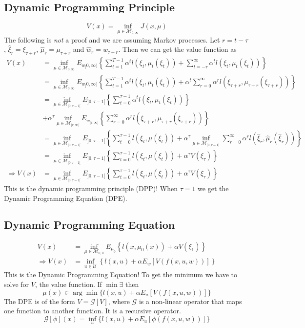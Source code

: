 \documentclass[lecture,12pt,]{pcms-l}
\theoremstyle{example}
\begin{document}
\subsection{Dynamic Programming Principle}
$$V(x) = \inf_{\mu\in\mathcal{M}_{0,\infty}} J(x,\mu)$$
The following is \textit{not} a proof and we are assuming Markov processes. Let $r=t-\tau$, $\hat{\xi}_r=\xi_{\tau+r}$, $\hat{\mu}_r=\mu_{\tau+r}$ and $\hat{w}_r=w_{\tau+r}$. Then we can get the value function as
\begin{align}
V(x) &= \inf_{\mu\in\mathcal{M}_{0,\infty}} E_{w_]0,\infty)} \left\lbrace \sum_{t=1}^{T-1} \alpha^tl(\xi_t,\mu_t(\xi_t)) + \sum_{t=-\tau}^\infty \alpha^tl(\xi_t,\mu_t(\xi_t))\right\rbrace \nonumber \\
&= \inf_{\mu\in\mathcal{M}_{0,\infty}} E_{w_]0,\infty)} \left\lbrace \sum_{t=1}^{T-1} \alpha^tl(\xi_t,\mu_t(\xi_t)) +  \alpha^t \sum_{r=0}^\infty \alpha^rl(\xi_{\tau+r},\mu_{\tau+r}(\xi_{\tau+r})) \right\rbrace \nonumber \\
&= \inf_{\mu\in\mathcal{M}_{]0,\tau-1[}} E_{]0,\tau-1[} \left\lbrace \sum_{t=0}^{\tau-1} \alpha^tl(\xi_t,\mu_t(\xi_t))\right\rbrace \nonumber \\
&+ \alpha^\tau\inf_{\mu\in\mathcal{M}_{]\tau,\infty[}} E_{w_{]\tau,\infty[}} \left\lbrace \sum_{r=0}^\infty\alpha^rl(\xi_{\tau+r},\mu_{\tau+r}(\xi_{\tau+r}))\right\rbrace \nonumber \\
&= \inf_{\mu\in\mathcal{M}_{]0,\tau-1[}} E_{]0,\tau-1[} \left\lbrace \sum_{t=0}^{\tau-1} l(\xi_t,\mu(\xi_t)) + \alpha^\tau \inf_{\mu\in\mathcal{M}_{]0,\tau-1[}} \sum_{r=0}^\infty \alpha^rl(\hat{\xi}_r,\hat{\mu}_r(\hat{\xi}_r)) \right\rbrace \nonumber \\
&= \inf_{\mu\in\mathcal{M}_{]0,\tau-1[}} E_{]0,\tau-1[} \left\lbrace \sum_{t=0}^{\tau-1} l(\xi_t,\mu(\xi_t)) + \alpha^\tau V(\xi_\tau) \right\rbrace \nonumber \\
\Rightarrow V(x) &= \inf_{\mu\in\mathcal{M}_{]0,\tau-1[}} E_{]0,\tau-1[} \left\lbrace \sum_{t=0}^{\tau-1} l(\xi_t,\mu(\xi_t)) + \alpha^\tau V(\xi_\tau) \right\rbrace
\end{align}
This is the dynamic programming principle (DPP)! When $\tau=1$ we get the Dynamic Programming Equation (DPE).

\subsection{Dynamic Programming Equation}
\begin{align}
V(x) &= \inf_{\mu\in\mathcal{M}_{0,0}} E_{\mu_0} \left\lbrace l(x,\mu_0(x)) + \alpha V(\xi_1) \right\rbrace \nonumber \\
\Rightarrow V(x) &= \inf_{u\in\mathcal{U}} \left\lbrace l(x,u) + \alpha E_w[V(f(x,u,w))] \right\rbrace
\end{align}
This is the Dynamic Programming Equation! To get the minimum we have to solve for $V$, the value function. If $\min\exists$ then
$$\mu(x)\in\arg\min\{l(x,u)+\alpha E_u[V(f(x,u,w))]\}$$
The DPE is of the form $V=\mathcal{G}[V]$, where $\mathcal{G}$ is a non-linear operator that maps one function to another function. It is a recursive operator.
$$\mathcal{G}[\phi](x) = \inf_u\{l(x,u)+\alpha E_u[\phi(f(x,u,w))]\}$$
\end{document}
